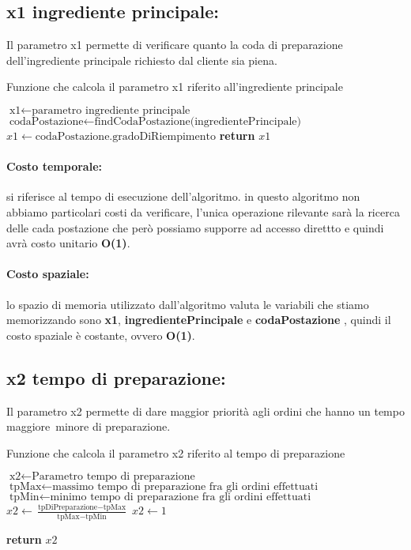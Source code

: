 \subsection{x1 ingrediente principale:}
Il  parametro x1 permette di verificare quanto la coda di preparazione dell'ingrediente principale richiesto dal cliente sia piena.
\begin{algorithm}[h]
	\begin{algorithmic}[h!]
		\caption{Funzione che calcola il parametro x1 riferito all'ingrediente principale}
		\medskip
		\State $\text{x1} \gets \text{parametro ingrediente principale}$
		\medskip
		\State $\text{codaPostazione} \gets \text{findCodaPostazione(ingredientePrincipale)}$
		\State $x1 \gets {\text{codaPostazione.gradoDiRiempimento}}$
		\State \textbf{return} $x1$
		\EndFunction
	\end{algorithmic}
\end{algorithm}

\paragraph{Costo temporale:}
si riferisce al tempo di esecuzione dell’algoritmo. in questo algoritmo non abbiamo particolari costi da verificare, l'unica operazione rilevante sarà la ricerca delle cada postazione che però possiamo supporre  ad accesso direttto e quindi avrà costo unitario \textbf{O(1)}.

\paragraph{Costo spaziale:}
lo spazio di memoria utilizzato dall’algoritmo valuta le variabili che stiamo memorizzando sono \textbf{x1}, \textbf{ingredientePrincipale} e \textbf{codaPostazione} , quindi il costo spaziale è costante, ovvero \textbf{O(1)}.

\subsection{x2 tempo di preparazione:}
Il  parametro x2 permette di dare maggior priorità agli ordini che hanno un tempo maggiore\ minore di preparazione.
\begin{algorithm}[h]
	\begin{algorithmic}[h!]
		\caption{Funzione che calcola il parametro x2 riferito al tempo di preparazione }
		\medskip
		\State $\text{x2} \gets \text{Parametro tempo di preparazione}$
		\State $\text{tpMax} \gets \text{massimo tempo di preparazione fra gli ordini effettuati}$
		\State $\text{tpMin} \gets \text{minimo tempo di preparazione fra gli ordini effettuati}$
		\medskip
		\State $x2 \gets \frac{\text{tpDiPreparazione} - \text{tpMax}}{\text{tpMax} - \text{tpMin}}$ 
		\Else
		\State $x2 \gets 1$
		\EndIf
		
		\State \textbf{return} $x2$ 
		\EndFunction
	\end{algorithmic}
\end{algorithm}

